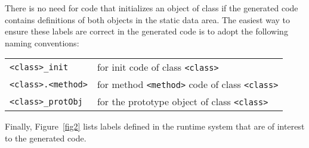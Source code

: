 There is no need for code that initializes an object of class 
if the generated code contains definitions of both  objects
in the static data area.
The easiest way to ensure these labels are correct in the generated code 
is to adopt the following naming conventions:
\begin{center}
\begin{tabular}{ll}
\verb#<class>_init#	&	for init code of class
\verb#<class>#\\
\verb#<class>.<method>#	&	for method \verb#<method># code of class
\verb#<class>#\\
\verb#<class>_protObj#	&	for the prototype object of class
\verb#<class>#\\
\end{tabular}
\end{center}
Finally, Figure~\ref{fig2} lists labels defined in the runtime system that are of
interest to the generated code.


